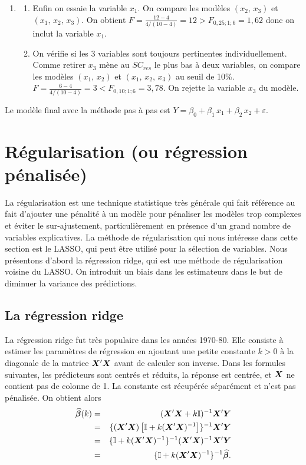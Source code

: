 \begin{exemple}
\begin{enumerate}
    \item
        \begin{enumerate}[label=$\bullet$]
        \item Enfin on essaie la variable $x_1$. On compare les modèles $(x_2,\,x_3)$ et $(x_1,\,x_2,\,x_3)$. On obtient $F=\frac{12-4}{4/(10-4)}=12>F_{0,25;1;6}=1,62$ donc on inclut la variable $x_1$.
        \item On vérifie si les 3 variables  sont toujours pertinentes individuellement. Comme retirer $x_3$ mène au $SC_{res}$ le plus bas à deux variables, on compare les modèles $(x_1,\,x_2)$ et $(x_1,\,x_2,\,x_3)$ au seuil de 10\%. $F=\frac{6-4}{4/(10-4)}=3 < F_{0,10;1;6}=3,78$. On rejette la variable $x_3$ du modèle.
        \end{enumerate}

    \end{enumerate}
    Le modèle final avec la méthode pas à pas est $Y=\beta_0+\beta_1\,x_1+\beta_2\,x_2+\varepsilon$.
\end{exemple}

\newpage
\section{Régularisation (ou régression pénalisée)}

La régularisation est une technique statistique très générale qui fait référence au fait d'ajouter une pénalité à un modèle pour pénaliser les modèles trop complexes et éviter le sur-ajustement, particulièrement en présence d'un grand nombre de variables explicatives. La méthode de régularisation qui nous intéresse dans cette section est le LASSO, qui peut être utilisé pour la sélection de variables. Nous présentons d'abord la régression ridge, qui est une méthode de régularisation voisine du LASSO. On introduit un biais dans les estimateurs dans le but de diminuer la variance des prédictions.

\subsection{La régression \og ridge \fg}
\label{sec:ridge}

La régression ridge fut très populaire dans les années 1970-80. Elle consiste à estimer les paramètres de régression en ajoutant une petite constante $k>0$ à la diagonale de la matrice $\bm{X}'\bm{X}$ avant de calculer son inverse. %
Dans les formules suivantes, les prédicteurs sont centrés et réduits, la réponse est centrée, et $\bm{X}$ ne contient pas de colonne de 1. La constante est récupérée séparément et n'est pas pénalisée.
On obtient alors
\begin{eqnarray*}
\widehat{\bm\beta}(k) & = & (\bm{X}'\bm{X}+k\bm{\mathbb{I}})^{-1}\bm{X}'\bm{Y}  \\
& = & \{(\bm{X}'\bm{X})\left[\bm{\mathbb{I}}+k(\bm{X}'\bm{X})^{-1}\right]\}^{-1}\bm{X}'\bm{Y}  \\
& = & \{\bm{\mathbb{I}}+k(\bm{X}'\bm{X})^{-1}\}^{-1}(\bm{X}'\bm{X})^{-1}\bm{X}'\bm{Y} \\
& = & \{\bm{\mathbb{I}}+k(\bm{X}'\bm{X})^{-1}\}^{-1}\widehat{\bm\beta}.
\end{eqnarray*}

